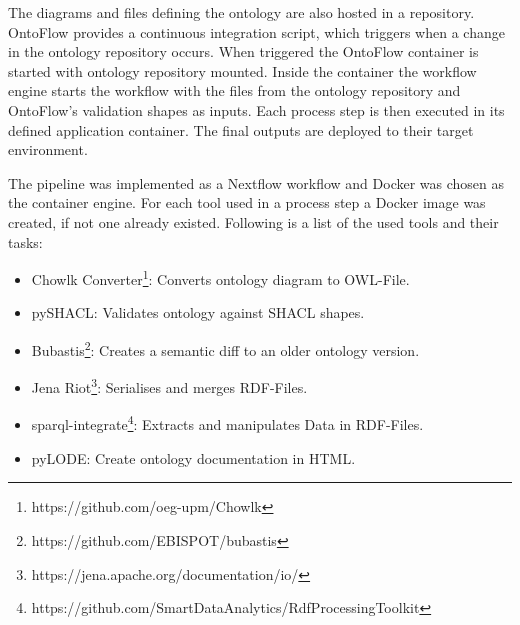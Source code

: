 \documentclass[sigconf]{acmart}
\begin{document}
The diagrams and files defining the ontology are also hosted in a repository.
OntoFlow provides a continuous integration script, which triggers when a change in the ontology repository occurs.
When triggered the OntoFlow container is started with ontology repository mounted.
Inside the container the workflow engine starts the workflow with the files from the ontology repository and OntoFlow's validation shapes as inputs.
Each process step is then executed in its defined application container.
The final outputs are deployed to their target environment.


The pipeline was implemented as a Nextflow workflow and Docker was chosen as the container engine.
For each tool used in a process step a Docker image was created, if not one already existed.
Following is a list of the used tools and their tasks:

\begin{itemize}
  \item Chowlk Converter\footnote{https://github.com/oeg-upm/Chowlk}: Converts ontology diagram to OWL-File.
  \item pySHACL: Validates ontology against SHACL shapes.
  \item Bubastis\footnote{https://github.com/EBISPOT/bubastis}: Creates a semantic diff to an older ontology version.
  \item Jena Riot\footnote{https://jena.apache.org/documentation/io/}: Serialises and merges RDF-Files.
  \item sparql-integrate\footnote{https://github.com/SmartDataAnalytics/RdfProcessingToolkit}: Extracts and manipulates Data in RDF-Files.
  \item pyLODE: Create ontology documentation in HTML.
\end{itemize}
\end{document}
